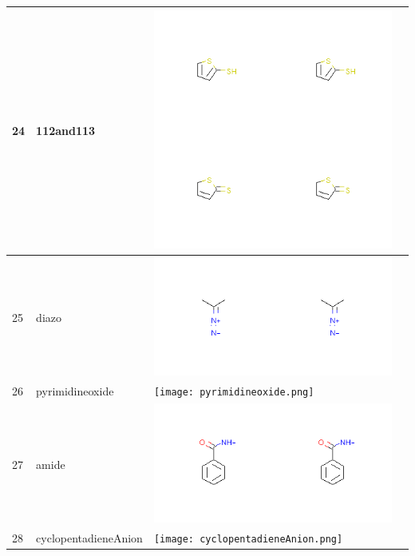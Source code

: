\begin{longtable}{|l|l|l|l|}
\hline
24 & 112and113 & \includegraphics[scale=0.6]{112and113.png} & \\
\hline
25 & diazo & \includegraphics[scale=0.6]{diazo.png} & \\
\hline
26 & pyrimidineoxide & \texttt{[image: pyrimidineoxide.png]} & \\
\hline
27 & amide & \includegraphics[scale=0.6]{amide.png} & \\
\hline
28 & cyclopentadieneAnion & \texttt{[image: cyclopentadieneAnion.png]} & \\
\hline
\end{longtable}